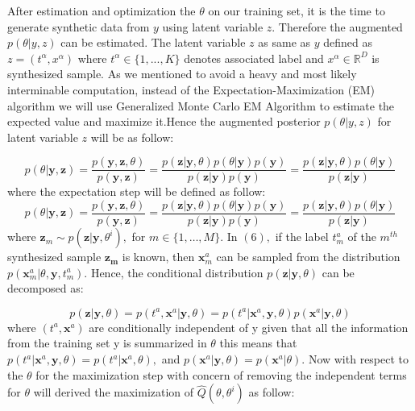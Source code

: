 After estimation and optimization the $\theta$ on our training set, it is the time to generate
synthetic data from $y$ using latent variable $z$. Therefore the augmented $p(\theta | y,z)$ can be
estimated. The latent variable $z$ as same as $y$ defined as $z = (t^{\alpha}, x^{\alpha})$ where
$t^{\alpha} \in \{1,...,K\}$ denotes associated label and $x^{\alpha} \in   \mathbb{R}^D$ is
synthesized sample. As we mentioned to avoid a heavy and most likely interminable computation,
instead of the Expectation-Maximization (EM) algorithm we will use Generalized Monte Carlo EM
Algorithm to estimate the expected value and maximize it.Hence the augmented posterior $p(\theta|y,
  z)$ for latent variable $z$ will be as follow:

\begin{equation} \label{eq:latent-variable}
  p(\theta | \mathbf{y}, \mathbf{z})=\frac{p(\mathbf{y}, \mathbf{z}, \theta)}{p(\mathbf{y}, \mathbf{z})}=\frac{p(\mathbf{z} | \mathbf{y}, \theta) p(\theta | \mathbf{y}) p(\mathbf{y})}{p(\mathbf{z} | \mathbf{y}) p(\mathbf{y})}=\frac{p(\mathbf{z} | \mathbf{y}, \theta) p(\theta | \mathbf{y})}{p(\mathbf{z} | \mathbf{y})}
\end{equation}
where the expectation step will be defined as follow:
\begin{equation} \label{eq:expectation-latent-variable}
  p(\theta | \mathbf{y}, \mathbf{z})=\frac{p(\mathbf{y}, \mathbf{z}, \theta)}{p(\mathbf{y}, \mathbf{z})}=\frac{p(\mathbf{z} | \mathbf{y}, \theta) p(\theta | \mathbf{y}) p(\mathbf{y})}{p(\mathbf{z} | \mathbf{y}) p(\mathbf{y})}=\frac{p(\mathbf{z} | \mathbf{y}, \theta) p(\theta | \mathbf{y})}{p(\mathbf{z} | \mathbf{y})}
\end{equation}
where \(\mathbf{z}_{m} \sim p\left(\mathbf{z} | \mathbf{y}, \theta^{i}\right),\) for \(m \in\{1,
\ldots, M\} .\) In \((6),\) if the label \(t_{m}^{a}\) of the \(m^{t h}\) synthesized sample
\(\mathbf{z}_{\mathbf{m}}\) is known, then \(\mathbf{x}_{m}^{a}\) can be sampled from the
distribution \(p\left(\mathbf{x}_{m}^{a} | \theta, \mathbf{y}, t_{m}^{a}\right) .\) Hence, the
conditional distribution \(p(\mathbf{z} | \mathbf{y}, \theta)\) can be decomposed as:

\begin{equation}
  p(\mathbf{z} | \mathbf{y}, \theta)=p\left(t^{a}, \mathbf{x}^{a} | \mathbf{y}, \theta\right)=p\left(t^{a} | \mathbf{x}^{a}, \mathbf{y}, \theta\right) p\left(\mathbf{x}^{a} | \mathbf{y}, \theta\right)
\end{equation}
where \(\left(t^{a}, \mathbf{x}^{a}\right)\) are conditionally independent of y given that all the
information from the training set y is summarized in \(\theta\) this means that \(p\left(t^{a} |
\mathbf{x}^{a}, \mathbf{y}, \theta\right)=p\left(t^{a} | \mathbf{x}^{a}, \theta\right),\) and
\(p\left(\mathbf{x}^{a} | \mathbf{y}, \theta\right)=p\left(\mathbf{x}^{a} | \theta\right)\).
Now with respect to the $\theta$ for the maximization step with concern of removing the independent terms
for $\theta$ will derived the maximization of $\hat{Q}\left(\theta, \theta^{i}\right)$ as follow:


